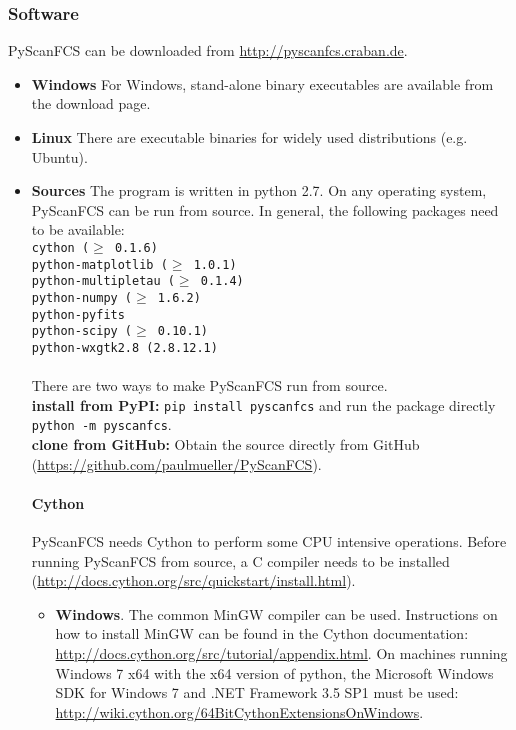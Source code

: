 \subsubsection*{Software}
PyScanFCS can be downloaded from \url{http://pyscanfcs.craban.de}.
\begin{itemize}
\item \textbf{Windows}
For Windows, stand-alone binary executables are available from the download page. 
\item \textbf{Linux}
There are executable binaries for widely used distributions (e.g. Ubuntu).
\item \textbf{Sources}
The program is written in python 2.7. On any operating system, PyScanFCS can be run from source. In general, the following packages need to be available:
\texttt{\\
cython ($\geq$ 0.1.6)\\
python-matplotlib ($\geq$ 1.0.1) \\
python-multipletau ($\geq$ 0.1.4) \\
python-numpy ($\geq$ 1.6.2) \\
python-pyfits \\
python-scipy ($\geq$ 0.10.1) \\
python-wxgtk2.8 (2.8.12.1) \\
}
\\
There are two ways to make PyScanFCS run from source.\\
\textbf{install from PyPI:}
\texttt{pip install pyscanfcs}
and run the package directly
\texttt{python -m pyscanfcs}.
\\
\textbf{clone from GitHub:}
Obtain the source directly from GitHub (\url{https://github.com/paulmueller/PyScanFCS}).


\paragraph*{Cython}
PyScanFCS needs Cython to perform some CPU intensive operations. Before running PyScanFCS from source, a C compiler needs to be installed (\url{http://docs.cython.org/src/quickstart/install.html}).
\begin{itemize}
\item[ ] \textbf{Windows}. The common MinGW compiler can be used. Instructions on how to install MinGW can be found in the Cython documentation: \url{http://docs.cython.org/src/tutorial/appendix.html}. On machines running Windows 7 x64 with the x64 version of python, the Microsoft Windows SDK for Windows 7 and .NET Framework 3.5 SP1 must be used: \\
\url{http://wiki.cython.org/64BitCythonExtensionsOnWindows}.


\end{itemize}
\end{itemize}
